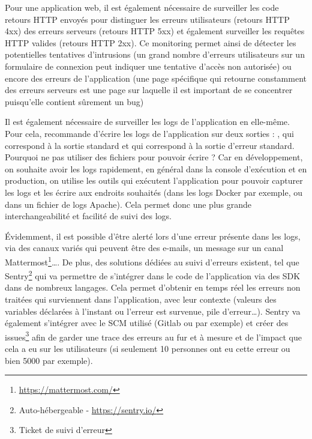 
Pour une application web, il est également nécessaire de surveiller les code retours \gls{HTTP} envoyés pour distinguer les erreurs utilisateurs (retours \gls{HTTP} 4xx) des erreurs serveurs (retours \gls{HTTP} 5xx) et également surveiller les requêtes \gls{HTTP} valides (retours \gls{HTTP} 2xx). Ce monitoring permet ainsi de détecter les potentielles tentatives d'intrusions (un grand nombre d'erreurs utilisateurs sur un formulaire de connexion peut indiquer une tentative d'accès non autorisée) ou encore des erreurs de l'application (une page spécifique qui retourne constamment des erreurs serveurs est une page sur laquelle il est important de se concentrer puisqu'elle contient sûrement un bug)

Il est également nécessaire de surveiller les logs de l'application en elle-même. Pour cela,  \cite{12factor} recommande d'écrire les logs de l'application sur deux sorties : , qui correspond à la sortie standard et  qui correspond à la sortie d'erreur standard. Pourquoi ne pas utiliser des fichiers pour pouvoir écrire ? Car en développement, on souhaite avoir les logs rapidement, en général dans la console d'exécution et en production, on utilise les outils qui exécutent l'application pour pouvoir capturer les logs et les écrire aux endroits souhaités (dans les logs Docker par exemple, ou dans un fichier de logs Apache). Cela permet donc une plus grande interchangeabilité et facilité de suivi des logs. 

Évidemment, il est possible d'être alerté lors d'une erreur présente dans les logs, via des canaux variés qui peuvent être des e-mails, un message sur un canal Mattermost\footnote{\url{https://mattermost.com/}}\ldots{}. De plus, des solutions dédiées au suivi d'erreurs existent, tel que Sentry\footnote{Auto-hébergeable - \url{https://sentry.io/}} qui va permettre de s'intégrer dans le code de l'application via des \gls{SDK} dans de nombreux langages. Cela permet d'obtenir en temps réel les erreurs non traitées qui surviennent dans l'application, avec leur contexte (valeurs des variables déclarées à l'instant ou l'erreur est survenue, pile d'erreur\ldots). Sentry va également s'intégrer avec le \gls{SCM} utilisé (Gitlab ou \github{} par exemple) et créer des issues\footnote{Ticket de suivi d'erreur} afin de garder une trace des erreurs au fur et à mesure et de l'impact que cela a eu sur les utilisateurs (si seulement 10 personnes ont eu cette erreur ou bien 5000 par exemple). 


